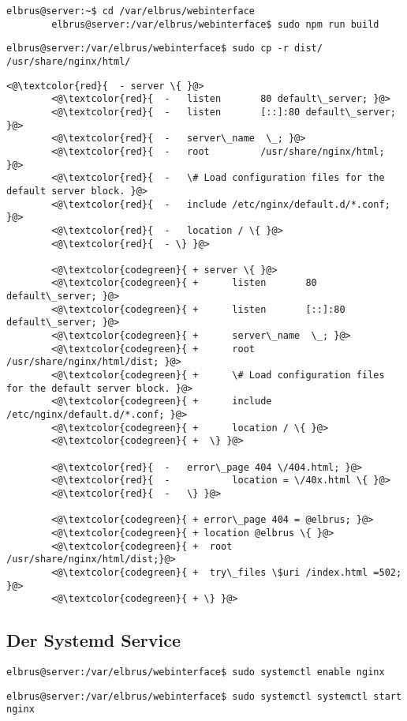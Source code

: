 	\lstset{style=commands}
	\begin{lstlisting}[caption={Compilieren des Webinterface.}]
		elbrus@server:~$ cd /var/elbrus/webinterface
		elbrus@server:/var/elbrus/webinterface$ sudo npm run build
	\end{lstlisting}

	\lstset{style=commands}
	\begin{lstlisting}[caption={Kopieren des kompilierten Webinterfaces in der Ordner des Webservers.}]
		elbrus@server:/var/elbrus/webinterface$ sudo cp -r dist/ /usr/share/nginx/html/
	\end{lstlisting}

	\lstset{style=files}
	\begin{lstlisting}[caption={/etc/nginx/nginx.conf - Ändern der folgenden Zeilen.}, numbers=none, keepspaces=true]
		<@\textcolor{red}{	- server \{ }@>
		<@\textcolor{red}{	- 	listen       80 default\_server; }@>
		<@\textcolor{red}{	-	listen       [::]:80 default\_server; }@>
		<@\textcolor{red}{	-	server\_name  \_; }@>
		<@\textcolor{red}{	-	root         /usr/share/nginx/html; }@>
		<@\textcolor{red}{	-	\# Load configuration files for the default server block. }@>
		<@\textcolor{red}{	-	include /etc/nginx/default.d/*.conf; }@>
		<@\textcolor{red}{	-	location / \{ }@>
		<@\textcolor{red}{	- \} }@>
		
		<@\textcolor{codegreen}{ + server \{ }@>
		<@\textcolor{codegreen}{ +		listen       80 default\_server; }@>
		<@\textcolor{codegreen}{ +		listen       [::]:80 default\_server; }@>
		<@\textcolor{codegreen}{ +		server\_name  \_; }@>
		<@\textcolor{codegreen}{ +		root         /usr/share/nginx/html/dist; }@>
		<@\textcolor{codegreen}{ +		\# Load configuration files for the default server block. }@>
		<@\textcolor{codegreen}{ +		include /etc/nginx/default.d/*.conf; }@>
		<@\textcolor{codegreen}{ +		location / \{ }@>
		<@\textcolor{codegreen}{ +	\} }@>
		
		<@\textcolor{red}{	-	error\_page 404 \/404.html; }@>
		<@\textcolor{red}{	-			location = \/40x.html \{ }@>
		<@\textcolor{red}{	-	\} }@>
		
		<@\textcolor{codegreen}{ + error\_page 404 = @elbrus; }@>
		<@\textcolor{codegreen}{ + location @elbrus \{ }@>
		<@\textcolor{codegreen}{ +	root  /usr/share/nginx/html/dist;}@>
		<@\textcolor{codegreen}{ +	try\_files \$uri /index.html =502; }@>
		<@\textcolor{codegreen}{ + \} }@>
	\end{lstlisting}
	\newpage

	\subsection[systemd service]{Der Systemd Service}
	
	\lstset{style=commands}
	\begin{lstlisting}[caption={Aktivieren des Webservers.}]
		elbrus@server:/var/elbrus/webinterface$ sudo systemctl enable nginx
	\end{lstlisting}
	
	\lstset{style=commands}
	\begin{lstlisting}[caption={Starten des Webservers.}]
		elbrus@server:/var/elbrus/webinterface$ sudo systemctl systemctl start nginx 
	\end{lstlisting}